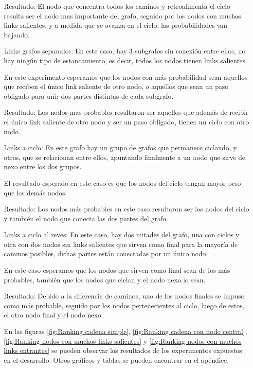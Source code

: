 Resultado: El nodo que concentra todos los caminos y retroalimenta el ciclo resulta ser el nodo mas importante del grafo, seguido por los nodos con muchos links salientes, y a medida que se avanza en el ciclo, las probabilidades van bajando.

Links grafos separados: En este caso, hay 3 subgrafos sin conexi\'on entre ellos, no hay ning\'un tipo de estancamiento, es decir, todos los nodos tienen links salientes.

En este experimento esperamos que los nodos con m\'as probabilidad sean aquellos que reciben el \'unico link saliente de otro nodo, o aquellos que sean un paso obligado para unir dos partes distintas de cada subgrafo.

Resultado: Los nodos mas probables resultaron ser aquellos que adem\'as de recibir el \'unico link saliente de otro nodo y ser un paso obligado, tienen un ciclo con otro nodo.

Links a ciclo: En este grafo hay un grupo de grafos que permanece ciclando, y otros, que se relacionan entre ellos, apuntando finalmente a un nodo que sirve de nexo entre los dos grupos.

El resultado esperado en este caso es que los nodos del ciclo tengan mayor peso que los dem\'as nodos.

Resultado: Los nodos m\'as probables en este caso resultaron ser los nodos del ciclo y tambi\'en el nodo que conecta las dos partes del grafo.

Links a ciclo al reves: En este caso, hay dos mitades del grafo, una con ciclos y otra con dos nodos sin links salientes que sirven como final para la mayor\'ia de caminos posibles, dichas partes est\'an conectadas por un \'unico nodo.

En este caso esperamos que los nodos que sirven como final sean de los m\'as probables, tambi\'en que los nodos que ciclan y el nodo nexo lo sean.

Resultado: Debido a la diferencia de caminos, uno de los nodos finales se impuso como m\'as probable, seguido por los nodos pertenecientes al ciclo, luego de estos, el otro nodo final y el nodo nexo.


En las figuras \ref{fig:Ranking cadena simple}, \ref{fig:Ranking cadena con nodo central}, \ref{fig:Ranking nodos con muchos links salientes} y \ref{fig:Ranking nodos con muchos links entrantes} se pueden observar los resultados de los experimentos expuestos en el desarrollo.
Otros gráficos y tablas se pueden encontrar en el apéndice.

